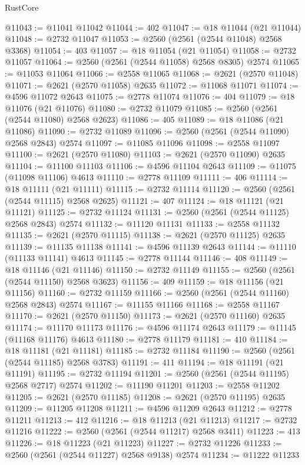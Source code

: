\begin{lexlean}{RustCore}
\begin{coremodule}
@11043 := @11041 @11042
@11044 := 402
@11047 := @18 @11044 (@21 @11044)
@11048 := @2732 @11047
@11053 := @2560 (@2561 (@2544 @11048) @2568 @3368)
@11054 := 403
@11057 := @18 @11054 (@21 @11054)
@11058 := @2732 @11057
@11064 := @2560 (@2561 (@2544 @11058) @2568 @8305) @2574
@11065 := @11053 @11064
@11066 := @2558 @11065
@11068 := @2621 (@2570 @11048)
@11071 := @2621 (@2570 @11058) @2635
@11072 := @11068 @11071
@11074 := @4596 @11072 @2643
@11075 := @2778 @11074
@11076 := 404
@11079 := @18 @11076 (@21 @11076)
@11080 := @2732 @11079
@11085 := @2560 (@2561 (@2544 @11080) @2568 @2623)
@11086 := 405
@11089 := @18 @11086 (@21 @11086)
@11090 := @2732 @11089
@11096 := @2560 (@2561 (@2544 @11090) @2568 @2843) @2574
@11097 := @11085 @11096
@11098 := @2558 @11097
@11100 := @2621 (@2570 @11080)
@11103 := @2621 (@2570 @11090) @2635
@11104 := @11100 @11103
@11106 := @4596 @11104 @2643
@11109 := @11075 (@11098 @11106) @4613
@11110 := @2778 @11109
@11111 := 406
@11114 := @18 @11111 (@21 @11111)
@11115 := @2732 @11114
@11120 := @2560 (@2561 (@2544 @11115) @2568 @2625)
@11121 := 407
@11124 := @18 @11121 (@21 @11121)
@11125 := @2732 @11124
@11131 := @2560 (@2561 (@2544 @11125) @2568 @2843) @2574
@11132 := @11120 @11131
@11133 := @2558 @11132
@11135 := @2621 (@2570 @11115)
@11138 := @2621 (@2570 @11125) @2635
@11139 := @11135 @11138
@11141 := @4596 @11139 @2643
@11144 := @11110 (@11133 @11141) @4613
@11145 := @2778 @11144
@11146 := 408
@11149 := @18 @11146 (@21 @11146)
@11150 := @2732 @11149
@11155 := @2560 (@2561 (@2544 @11150) @2568 @3623)
@11156 := 409
@11159 := @18 @11156 (@21 @11156)
@11160 := @2732 @11159
@11166 := @2560 (@2561 (@2544 @11160) @2568 @2843) @2574
@11167 := @11155 @11166
@11168 := @2558 @11167
@11170 := @2621 (@2570 @11150)
@11173 := @2621 (@2570 @11160) @2635
@11174 := @11170 @11173
@11176 := @4596 @11174 @2643
@11179 := @11145 (@11168 @11176) @4613
@11180 := @2778 @11179
@11181 := 410
@11184 := @18 @11181 (@21 @11181)
@11185 := @2732 @11184
@11190 := @2560 (@2561 (@2544 @11185) @2568 @3783)
@11191 := 411
@11194 := @18 @11191 (@21 @11191)
@11195 := @2732 @11194
@11201 := @2560 (@2561 (@2544 @11195) @2568 @2717) @2574
@11202 := @11190 @11201
@11203 := @2558 @11202
@11205 := @2621 (@2570 @11185)
@11208 := @2621 (@2570 @11195) @2635
@11209 := @11205 @11208
@11211 := @4596 @11209 @2643
@11212 := @2778 @11211
@11213 := 412
@11216 := @18 @11213 (@21 @11213)
@11217 := @2732 @11216
@11222 := @2560 (@2561 (@2544 @11217) @2568 @3411)
@11223 := 413
@11226 := @18 @11223 (@21 @11223)
@11227 := @2732 @11226
@11233 := @2560 (@2561 (@2544 @11227) @2568 @9138) @2574
@11234 := @11222 @11233

\end{coremodule}
\end{lexlean}
